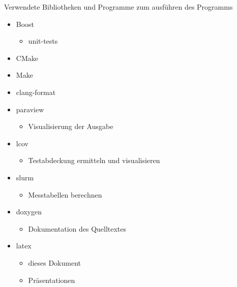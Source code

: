 \documentclass[
	12pt,
	a4paper,
	BCOR10mm,
	DIV14,
	headsepline,
]{scrreprt}
\begin{document}
Verwendete Bibliotheken und Programme zum ausführen des Programms
\begin{itemize}
	\item Boost
	\begin{itemize}
		\item unit-tests
	\end{itemize}
	\item CMake 
	\item Make
	\item clang-format
	\item paraview
	\begin{itemize}
		\item Visualisierung der Ausgabe
	\end{itemize}
	\item lcov
	\begin{itemize}
		\item Testabdeckung ermitteln und visualisieren
	\end{itemize}
	\item slurm
	\begin{itemize}
		\item Messtabellen berechnen
	\end{itemize}
	\item doxygen
	\begin{itemize}
		\item Dokumentation des Quelltextes
	\end{itemize}
	\item latex
	\begin{itemize}
		\item dieses Dokument
		\item Präsentationen
	\end{itemize}
\end{itemize}
\end{document}
